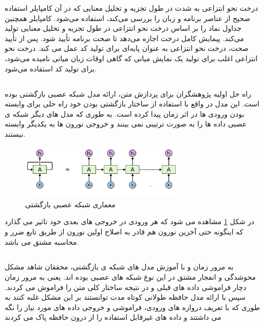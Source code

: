 درخت نحو انتزاعی به شدت در طول تجزیه و تحلیل معنایی که در آن کامپایلر استفاده صحیح از عناصر برنامه و زبان را بررسی می‌کند، استفاده می‌شود. کامپایلر همچنین جداول نماد را بر اساس درخت نحو انتزاعی در طول تجزیه و تحلیل معنایی تولید می‌کند. پیمایش کامل درخت اجازه می‌دهد تا صحت برنامه تأیید شود.
پس از تأیید صحت، درخت نحو انتزاعی  به عنوان پایه‌ای برای تولید کد عمل می کند. درخت نحو انتزاعی اغلب برای تولید یک نمایش میانی  که گاهی اوقات زبان میانی نامیده می‌شود، برای تولید کد استفاده می‌شود.
\cite{ast}
\subsection {}
راه حل اولیه پژوهشگران برای پردازش متن، ارائه مدل شبکه عصبی بازگشتی بوده است.  این مدل در واقع با
استفاده از ساختار بازگشتی بودن خود راه حلی برای وابسته بودن ورودی ها در اثر زمان پیدا کرده است. به طوری که
مدل های دیگر شبکه ی عصبی داده ها را به صورت ترتیبی نمی بینند و خروجی نورون ها به یکدیگر وابسته نیستند.
\begin{figure}[H]
	\centering
	\includegraphics[width=0.7\textwidth]{figures/RNN.png}
	\caption{معماری شبکه عصبی بازگشتی}
	\label{fig:RNN}
\end{figure}

در شکل \ref{fig:RNN} مشاهده می شود که هر ورودی در خروجی های بعدی خود تاثیر می گذارد که اینگونه حتی آخرین نورون
هم قادر به اصلاح اولین نورون از طریق تابع ضرر و محاسبه مشتق می باشد.
\cite{SHERSTINSKY2020132306}
\subsection{}
به مرور زمان و با آموزش مدل های شبکه ی بازگشتی، محققان شاهد مشکل محوشدگی و انفجار مشتق در این نوع
شبکه های عصبی بوده اند. یعنی به مرور زمان دچار فراموشی داده های قبلی و در نتیجه ساختار کلی متن را فراموش
می کردند.
سپس با ارائه مدل حافظه طولانی کوتاه مدت  توانستند بر این مشکل غلبه کنند به طوری که با تعریف دروازه های
ورودی، فراموشی و خروجی داده های مورد نیاز را نگه می داشتند و داده های غیرقابل استفاده را از درون حافظه پاک
می کردند

